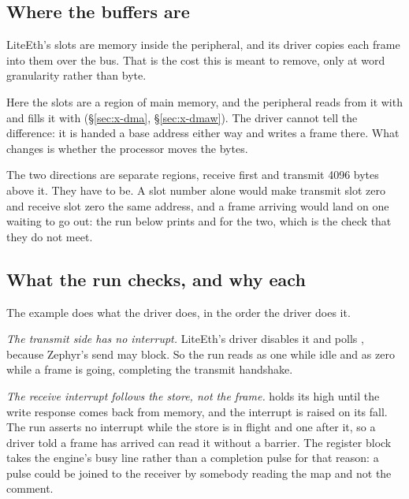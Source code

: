 \subsection{Where the buffers are}

LiteEth's slots are memory inside the peripheral, and its driver
copies each frame into them over the bus. That is the cost this is
meant to remove, only at word granularity rather than byte.

Here the slots are a region of main memory, and the peripheral reads
from it with  and fills it with 
(\S\ref{sec:x-dma}, \S\ref{sec:x-dmaw}). The driver cannot tell the
difference: it is handed a base address either way and writes a frame
there. What changes is whether the processor moves the bytes.

The two directions are separate regions, receive first and transmit
4096 bytes above it. They have to be. A slot number alone would make
transmit slot zero and receive slot zero the same address, and a
frame arriving would land on one waiting to go out: the run below
prints  and  for the two, which is
the check that they do not meet.



\subsection{What the run checks, and why each}

The example does what the driver does, in the order the driver does
it.

\emph{The transmit side has no interrupt.} LiteEth's driver disables
it and polls , because Zephyr's send may block. So
the run reads  as one while idle and as zero while a
frame is going, completing the transmit handshake.

\emph{The receive interrupt follows the store, not the frame.}
 holds its  high until the write
response comes back from memory, and the interrupt is raised on its
fall. The run asserts no interrupt while the store is in flight and
one after it, so a driver told a frame has arrived can read it
without a barrier. The register block takes the engine's busy line
rather than a completion pulse for that reason: a pulse could be
joined to the receiver by somebody reading the map and not the
comment.

